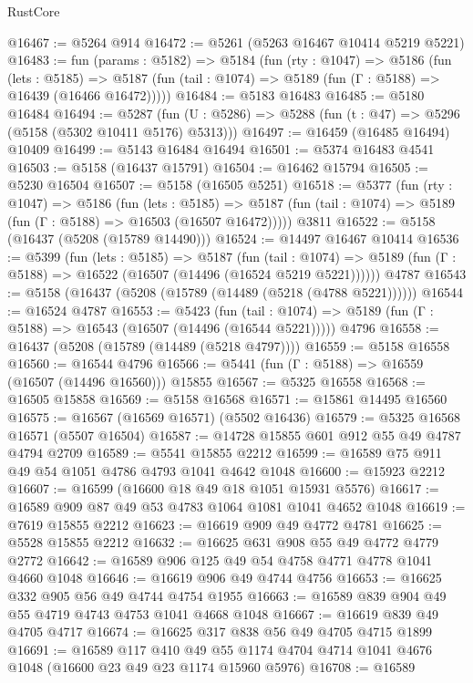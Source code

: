 \begin{lexlean}{RustCore}
\begin{coremodule}
@16467 := @5264 @914
@16472 := @5261 (@5263 @16467 @10414 @5219 @5221)
@16483 := fun (params : @5182) =>
  @5184
    (fun (rty : @1047) =>
    @5186
      (fun (lets : @5185) =>
      @5187 (fun (tail : @1074) => @5189 (fun (Γ : @5188) => @16439 (@16466 @16472)))))
@16484 := @5183 @16483
@16485 := @5180 @16484
@16494 := @5287
    (fun (U : @5286) => @5288 (fun (t : @47) => @5296 (@5158 (@5302 @10411 @5176) @5313)))
@16497 := @16459 (@16485 @16494) @10409
@16499 := @5143 @16484 @16494
@16501 := @5374 @16483 @4541
@16503 := @5158 (@16437 @15791)
@16504 := @16462 @15794
@16505 := @5230 @16504
@16507 := @5158 (@16505 @5251)
@16518 := @5377
    (fun (rty : @1047) =>
    @5186
      (fun (lets : @5185) =>
      @5187 (fun (tail : @1074) => @5189 (fun (Γ : @5188) => @16503 (@16507 @16472)))))
    @3811
@16522 := @5158 (@16437 (@5208 (@15789 @14490)))
@16524 := @14497 @16467 @10414
@16536 := @5399
    (fun (lets : @5185) =>
    @5187
      (fun (tail : @1074) =>
      @5189 (fun (Γ : @5188) => @16522 (@16507 (@14496 (@16524 @5219 @5221))))))
    @4787
@16543 := @5158 (@16437 (@5208 (@15789 (@14489 (@5218 (@4788 @5221))))))
@16544 := @16524 @4787
@16553 := @5423
    (fun (tail : @1074) => @5189 (fun (Γ : @5188) => @16543 (@16507 (@14496 (@16544 @5221)))))
    @4796
@16558 := @16437 (@5208 (@15789 (@14489 (@5218 @4797))))
@16559 := @5158 @16558
@16560 := @16544 @4796
@16566 := @5441 (fun (Γ : @5188) => @16559 (@16507 (@14496 @16560))) @15855
@16567 := @5325 @16558
@16568 := @16505 @15858
@16569 := @5158 @16568
@16571 := @15861 @14495 @16560
@16575 := @16567 (@16569 @16571) (@5502 @16436)
@16579 := @5325 @16568 @16571 (@5507 @16504)
@16587 := @14728 @15855 @601 @912 @55 @49 @4787 @4794 @2709
@16589 := @5541 @15855 @2212
@16599 := @16589 @75 @911 @49 @54 @1051 @4786 @4793 @1041 @4642 @1048
@16600 := @15923 @2212
@16607 := @16599 (@16600 @18 @49 @18 @1051 @15931 @5576)
@16617 := @16589 @909 @87 @49 @53 @4783 @1064 @1081 @1041 @4652 @1048
@16619 := @7619 @15855 @2212
@16623 := @16619 @909 @49 @4772 @4781
@16625 := @5528 @15855 @2212
@16632 := @16625 @631 @908 @55 @49 @4772 @4779 @2772
@16642 := @16589 @906 @125 @49 @54 @4758 @4771 @4778 @1041 @4660 @1048
@16646 := @16619 @906 @49 @4744 @4756
@16653 := @16625 @332 @905 @56 @49 @4744 @4754 @1955
@16663 := @16589 @839 @904 @49 @55 @4719 @4743 @4753 @1041 @4668 @1048
@16667 := @16619 @839 @49 @4705 @4717
@16674 := @16625 @317 @838 @56 @49 @4705 @4715 @1899
@16691 := @16589
    @117
    @410
    @49
    @55
    @1174
    @4704
    @4714
    @1041
    @4676
    @1048
    (@16600 @23 @49 @23 @1174 @15960 @5976)
@16708 := @16589

\end{coremodule}
\end{lexlean}
